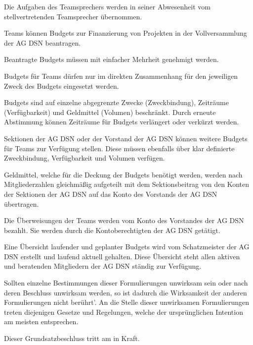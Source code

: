\documentclass[draft,parskip=half-,DIV=12,mpinclude]{scrartcl}
\begin{document}
\begin{contract}
Die Aufgaben des Teamsprechers werden in seiner Abwesenheit vom stellvertretenden Teamsprecher übernommen.


Teams können Budgets zur Finanzierung von Projekten in der Vollversammlung der AG DSN beantragen.

Beantragte Budgets müssen mit einfacher Mehrheit genehmigt werden.

Budgets für Teams dürfen nur im direkten Zusammenhang für den jeweiligen Zweck des Budgets eingesetzt werden.

Budgets sind auf einzelne abgegrenzte Zwecke (Zweckbindung), Zeiträume (Verfügbarkeit) und Geldmittel (Volumen) beschränkt. Durch erneute Abstimmung können Zeiträume für Budgets verlängert oder verkürzt werden.

Sektionen der AG DSN oder der Vorstand der AG DSN können weitere Budgets für Teams zur Verfügung stellen. Diese müssen ebenfalls über klar definierte Zweckbindung, Verfügbarkeit und Volumen verfügen.

Geldmittel, welche für die Deckung der Budgets benötigt werden, werden nach Mitgliederzahlen gleichmäßig aufgeteilt mit dem Sektionsbeitrag von den Konten der Sektionen der AG DSN auf das Konto des Vorstands der AG DSN übertragen.

Die Überweisungen der Teams werden vom Konto des Vorstandes der AG DSN bezahlt. Sie werden durch die Kontoberechtigten der AG DSN getätigt.

Eine Übersicht laufender und geplanter Budgets wird vom Schatzmeister der AG DSN erstellt und laufend aktuell gehalten. Diese Übersicht steht allen aktiven und beratenden Mitgliedern der AG DSN ständig zur Verfügung.

Sollten einzelne Bestimmungen dieser Formulierungen unwirksam sein oder nach deren Beschluss unwirksam werden, so ist dadurch die Wirksamkeit der anderen Formulierungen nicht berührt'. An die Stelle dieser unwirksamen Formulierungen treten diejenigen Gesetze und Regelungen, welche der ursprünglichen Intention am meisten entsprechen.

Dieser Grundsatzbeschluss tritt am  in Kraft.

\end{contract}
\end{document}
